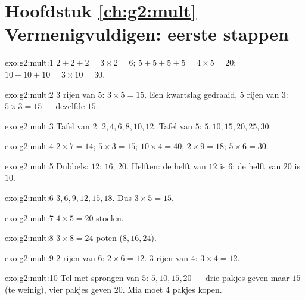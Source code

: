 \section*{Hoofdstuk \ref{ch:g2:mult} --- Vermenigvuldigen: eerste stappen}

\begin{solution}{exo:g2:mult:1}
$2 + 2 + 2 = 3 \times 2 = 6$; \quad
$5 + 5 + 5 + 5 = 4 \times 5 = 20$; \quad
$10 + 10 + 10 = 3 \times 10 = 30$.
\end{solution}

\begin{solution}{exo:g2:mult:2}
$3$ rijen van $5$: $3 \times 5 = 15$. Een kwartslag gedraaid, $5$ rijen
van $3$: $5 \times 3 = 15$ --- dezelfde $15$.
\end{solution}

\begin{solution}{exo:g2:mult:3}
Tafel van $2$: $2, 4, 6, 8, 10, 12$. Tafel van $5$:
$5, 10, 15, 20, 25, 30$.
\end{solution}

\begin{solution}{exo:g2:mult:4}
$2 \times 7 = 14$; \quad $5 \times 3 = 15$; \quad
$10 \times 4 = 40$; \quad $2 \times 9 = 18$; \quad
$5 \times 6 = 30$.
\end{solution}

\begin{solution}{exo:g2:mult:5}
Dubbels: $12$; $16$; $20$. Helften: de helft van $12$ is $6$; de helft
van $20$ is $10$.
\end{solution}

\begin{solution}{exo:g2:mult:6}
$3, 6, 9, 12, 15, 18$. Dus $3 \times 5 = 15$.
\end{solution}

\begin{solution}{exo:g2:mult:7}
$4 \times 5 = 20$ stoelen.
\end{solution}

\begin{solution}{exo:g2:mult:8}
$3 \times 8 = 24$ poten ($8, 16, 24$).
\end{solution}

\begin{solution}{exo:g2:mult:9}
$2$ rijen van $6$: $2 \times 6 = 12$. $3$ rijen van $4$:
$3 \times 4 = 12$.
\end{solution}

\begin{solution}{exo:g2:mult:10}
Tel met sprongen van $5$: $5, 10, 15, 20$ --- drie pakjes geven maar
$15$ (te weinig), vier pakjes geven $20$. Mia moet $4$ pakjes kopen.
\end{solution}
